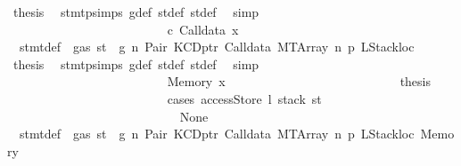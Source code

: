 \begin{isabellebody}
\ {\isacharquery}{\kern0pt}thesis\ \isamarkupfalse%
\ stmt{\isachardot}{\kern0pt}psimps{\isacharparenleft}{\kern0pt}{}{\isacharparenright}{\kern0pt}\ g{\isacharunderscore}{\kern0pt}def\ st{\isacharprime}{\kern0pt}{\isacharunderscore}{\kern0pt}def\ st{\isacharprime}{\kern0pt}{\isacharprime}{\kern0pt}{\isacharunderscore}{\kern0pt}def\ \isamarkupfalse%
\ simp\isanewline
\ \ \ \ \ \ \ \ \ \ \ \ \ \ \ \ \ \ \ \ \ \ \isamarkupfalse%
\isanewline
\ \ \ \ \ \ \ \ \ \ \ \ \ \ \ \ \ \ \ \ \ \ \ \ \isamarkupfalse%
\ c{}{\isacharcolon}{\kern0pt}\ {\isacharparenleft}{\kern0pt}Calldata\ x{}{\isacharparenright}{\kern0pt}\isanewline
\ \ \ \ \ \ \ \ \ \ \ \ \ \ \ \ \ \ \ \ \ \ \ \ \isamarkupfalse%
\ {}{\isacharparenleft}{\kern0pt}{}{\isacharparenright}{\kern0pt}\ stmt{\isacharunderscore}{\kern0pt}def\ {\isacharbackquoteopen}{\isasymnot}\ gas\ st\ {\isasymle}\ g{\isacharbackquoteclose}\ n\ Pair\ KCDptr\ Calldata\ MTArray\ n{}\ p{}\ LStackloc\ \isamarkupfalse%
\ {\isacharquery}{\kern0pt}thesis\ \isamarkupfalse%
\ stmt{\isachardot}{\kern0pt}psimps{\isacharparenleft}{\kern0pt}{}{\isacharparenright}{\kern0pt}\ g{\isacharunderscore}{\kern0pt}def\ st{\isacharprime}{\kern0pt}{\isacharunderscore}{\kern0pt}def\ st{\isacharprime}{\kern0pt}{\isacharprime}{\kern0pt}{\isacharunderscore}{\kern0pt}def\ \isamarkupfalse%
\ simp\isanewline
\ \ \ \ \ \ \ \ \ \ \ \ \ \ \ \ \ \ \ \ \ \ \isamarkupfalse%
\isanewline
\ \ \ \ \ \ \ \ \ \ \ \ \ \ \ \ \ \ \ \ \ \ \ \ \isamarkupfalse%
\ {\isacharparenleft}{\kern0pt}Memory\ x{}{\isacharparenright}{\kern0pt}\isanewline
\ \ \ \ \ \ \ \ \ \ \ \ \ \ \ \ \ \ \ \ \ \ \ \ \isamarkupfalse%
\ \isamarkupfalse%
\ {\isacharquery}{\kern0pt}thesis\isanewline
\ \ \ \ \ \ \ \ \ \ \ \ \ \ \ \ \ \ \ \ \ \ \ \ \isamarkupfalse%
\ {\isacharparenleft}{\kern0pt}cases\ {\isachardoublequoteopen}accessStore\ l\ {\isacharparenleft}{\kern0pt}stack\ st{\isacharprime}{\kern0pt}{\isacharprime}{\kern0pt}{\isacharprime}{\kern0pt}{\isacharparenright}{\kern0pt}{\isachardoublequoteclose}{\isacharparenright}{\kern0pt}\isanewline
\ \ \ \ \ \ \ \ \ \ \ \ \ \ \ \ \ \ \ \ \ \ \ \ \ \ \isamarkupfalse%
\ None\isanewline
\ \ \ \ \ \ \ \ \ \ \ \ \ \ \ \ \ \ \ \ \ \ \ \ \ \ \isamarkupfalse%
\ {}{\isacharparenleft}{\kern0pt}{}{\isacharparenright}{\kern0pt}\ stmt{\isacharunderscore}{\kern0pt}def\ {\isacharbackquoteopen}{\isasymnot}\ gas\ st\ {\isasymle}\ g{\isacharbackquoteclose}\ n\ Pair\ KCDptr\ Calldata\ MTArray\ n{}\ p{}\ LStackloc\ Memory\ \isamarkupfalse%

\end{isabellebody}
